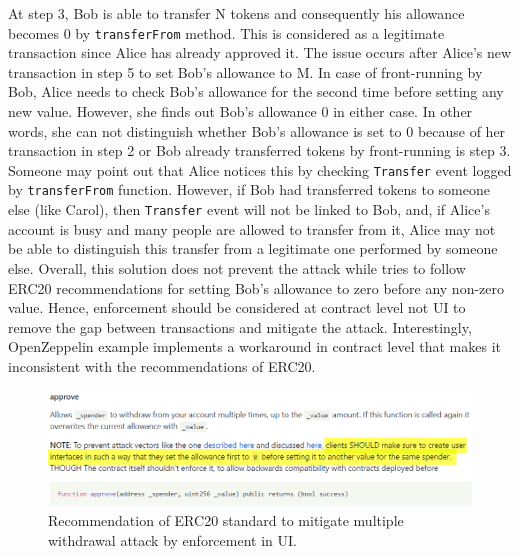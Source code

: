 At step 3, Bob is able to transfer N tokens and consequently his allowance becomes 0 by \texttt{transferFrom} method. This is considered as a legitimate transaction since Alice has already approved it. The issue occurs after Alice’s new transaction in step 5 to set Bob's allowance to M. In case of front-running by Bob, Alice needs to check Bob’s allowance for the second time before setting any new value. However, she finds out Bob’s allowance 0 in either case. In other words, she can not distinguish whether Bob’s allowance is set to 0 because of her transaction in step 2 or Bob already transferred tokens by front-running is step 3. Someone may point out that Alice notices this by checking \texttt{Transfer} event logged by \texttt{transferFrom} function. However, if Bob had transferred tokens to someone else (like Carol), then \texttt{Transfer} event will not be linked to Bob, and, if Alice’s account is busy and many people are allowed to transfer from it, Alice may not be able to distinguish this transfer from a legitimate one performed by someone else. Overall, this solution does not prevent the attack while tries to follow ERC20 recommendations for setting Bob’s allowance to zero before any non-zero value. Hence, enforcement should be considered at contract level not UI to remove the gap between transactions and mitigate the attack. Interestingly, OpenZeppelin example implements a workaround in contract level that makes it inconsistent with the recommendations of ERC20.
\begin{figure}[t!]
	\centering
	\includegraphics[width=1.0\linewidth]{figures/multiple_withdrawal_03.png}
	\caption{Recommendation of ERC20 standard to mitigate multiple withdrawal attack by enforcement in UI.\label{fig:uie}}
\end{figure}


